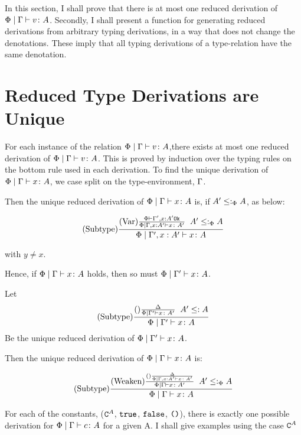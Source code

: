 \documentclass{report}
\begin{document}
    In this section, I shall prove that there is at most one reduced derivation of $\Phi\mid\Gamma \vdash v \colon A$. Secondly, I shall present a function for generating reduced derivations from arbitrary typing derivations, in a way that does not change the denotations. These imply that all typing derivations of a type-relation have the same denotation.

    \section{Reduced Type Derivations are Unique}
    For each instance of the relation $\Phi\mid\Gamma \vdash v \colon A$,there exists at most one reduced derivation of  $\Phi\mid\Gamma \vdash v \colon A$. This is proved by induction over the typing rules on the bottom rule used in each derivation.
    To find the unique derivation of $\Phi\mid\Gamma \vdash x \colon A$, we case split on the type-environment, $\Gamma$.

    Then the unique reduced derivation of $\Phi\mid\Gamma \vdash x \colon A$ is, if $A' \leq:_\Phi A$, as below:
    
    \begin{equation}
        (\text{Subtype}) \frac{(\text{Var}) \frac{\Phi\vdash \Gamma', x: A' \texttt{Ok}}{\Phi\mid\Gamma,x: A' \vdash x \colon A'}\;\; A' \leq:_\Phi A}{\Phi\mid\Gamma', x: A' \vdash x \colon A}
    \end{equation}

     with $y \neq x$.

    Hence, if $\Phi\mid\Gamma \vdash x \colon A$ holds, then so must $\Phi\mid\Gamma' \vdash x \colon A$.

    Let 
    \begin{equation}
        (\text{Subtype}) \frac{(\text{}) \frac{\Delta}{\Phi \mid \Gamma' \vdash x \colon A'}\;\; A' \leq: A}{\Phi \mid \Gamma' \vdash x \colon A}
    \end{equation}
    Be the  unique reduced derivation of $\Phi\mid\Gamma' \vdash x \colon A$.

    Then the unique reduced derivation of $\Phi\mid\Gamma \vdash x \colon A$ is:


    \begin{equation}
        (\text{Subtype}) \frac{
            (\text{Weaken}) \frac{
                (\text{}) \frac{\Delta}{\Phi\mid\Gamma, x: A' \vdash x \colon A'}
            }{\Phi\mid\Gamma \vdash x \colon A'}   
        \;\; A' \leq:_\Phi A
        }{\Phi\mid\Gamma \vdash x \colon A}
    \end{equation}

    For each of the constants, ($\texttt{C}^{A}$, $\texttt{true}$, $\texttt{false}$, $\texttt{()}$), there is exactly one possible derivation for $\Phi\mid\Gamma \vdash c \colon A$ for a given A. I shall give examples using the case $\texttt{C}^{A}$
\end{document}
